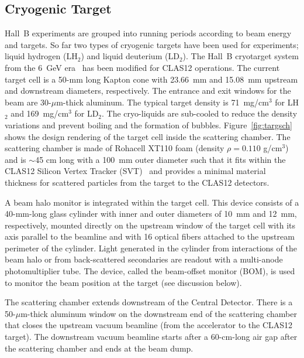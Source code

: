\subsection{Cryogenic Target}
\label{sec-cryotgt}

Hall~B experiments are grouped into running periods according to beam energy and targets. So far two types of
cryogenic targets have been used for experiments; liquid hydrogen (LH$_2$) and liquid deuterium (LD$_2$). The
Hall~B cryotarget system from the 6~GeV era~\cite{CLAS} has been modified for CLAS12 operations. The
current target cell is a 50-mm long Kapton cone with 23.66~mm and 15.08~mm upstream and downstream
diameters, respectively. The entrance and exit windows for the beam are 30-$\mu$m-thick aluminum. The
typical target density is 71~mg/cm$^3$ for LH$_2$ and 169~mg/cm$^3$ for LD$_2$. The cryo-liquids are
sub-cooled to reduce the density variations and prevent boiling and the formation of bubbles.
Figure~\ref{fig:targsch} shows the design rendering of the target cell inside the scattering chamber. The
scattering chamber is made of Rohacell XT110 foam (density $\rho=0.110$ g/cm$^3$) and is $\sim$45 cm long
with a 100~mm outer diameter such that it fits within the CLAS12 Silicon Vertex Tracker (SVT)~\cite{svt-nim}
and provides a minimal material thickness for scattered particles from the target to the CLAS12 detectors.  

A beam halo monitor is integrated within the target cell. This device consists of a 40-mm-long glass cylinder with
inner and outer diameters of 10~mm and 12~mm, respectively, mounted directly on the upstream window of the
target cell with its axis parallel to the beamline and with 16 optical fibers attached to the upstream perimeter of
the cylinder. Light generated in the cylinder from interactions of the beam halo or from back-scattered secondaries
are readout with a multi-anode photomultiplier tube. The device, called the  beam-offset monitor (BOM), is used to
monitor the beam position at the target (see discussion below).  

The scattering chamber extends downstream of the Central Detector. There is a 50-$\mu$m-thick aluminum
window on the downstream end of the scattering chamber that closes the upstream vacuum beamline (from the
accelerator to the CLAS12 target). The downstream vacuum beamline starts after a 60-cm-long air gap after the
scattering chamber and ends at the beam dump.  

